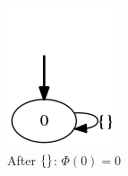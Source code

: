 \begin{example}
\begin{figure}[h!]
		\begin{subfigure}[b]{0.2\textwidth}
			\includegraphics[width=\textwidth]{images/on-the-fly-example-eve/step3.png}
			\caption{After $\{\}$: $\Phi(0)=0$}
		\end{subfigure}
		\hfill
		~ %
		\begin{subfigure}[b]{0.2\textwidth}

\end{subfigure}
\end{figure}
\end{example}
